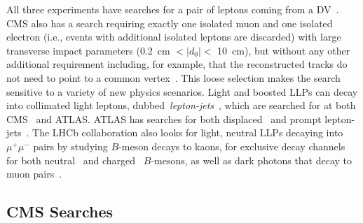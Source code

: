 All three experiments have searches for a pair of leptons coming from a DV~\cite{Aad:2015rba,CMS:2014hka,CMS:2015pca,Aaij:2015tna,Aaij:2016qsm,Aaij:2017rft}. CMS also has a search requiring exactly one isolated muon and one isolated electron (i.e., events with additional isolated leptons are discarded) with large transverse impact parameters (0.2~cm $< |d_{0}| <$ 10~cm), but without any other additional requirement including, for example, that the reconstructed tracks do not need to point to a common vertex~\cite{CMS-PAS-EXO-16-022}. This loose selection makes the search sensitive to a variety of new physics scenarios. Light and boosted LLPs can decay into collimated light leptons, dubbed~\emph{lepton-jets}~\cite{ArkaniHamed:2008qp}, which are searched for at both CMS~\cite{Khachatryan:2015wka,Sirunyan:2018mgs} and ATLAS. ATLAS has searches for both displaced~\cite{Aad:2014yea,ATLAS-CONF-2016-042} and prompt lepton-jets~\cite{Aad:2015sms}. The LHCb collaboration also looks for light, neutral LLPs decaying into $\mu^+ \mu^-$ pairs by studying $B$-meson decays to kaons, for exclusive decay channels for both neutral~\cite{Aaij:2015tna} and charged~\cite{Aaij:2016qsm} $B$-mesons, as well as dark photons that decay to muon pairs~\cite{Aaij:2017rft}.

\subsection{CMS Searches}
\label{sec:CMSleptonic}

